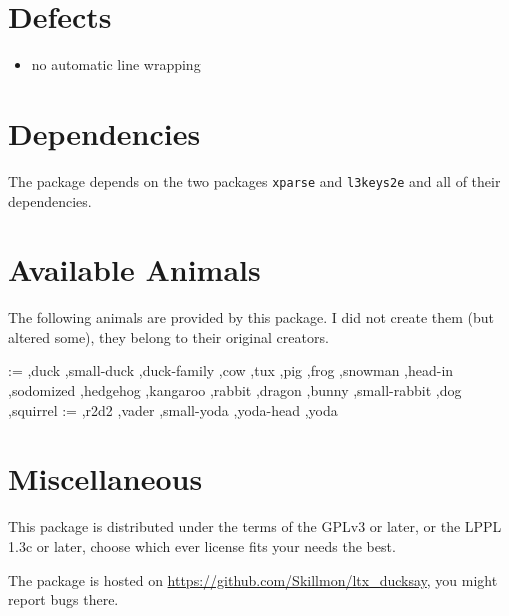 \documentclass[a4paper,10pt]{article}
\makeatletter
\newcommand*{\availableAnimal}[1]{\@for\cs:=#1\do{%
  \ifx\cs\@empty\else%
    \rlap{\expandafter\ducksay\expandafter[\cs]{\cs}}\hfill\mbox{}\\[1ex]%
  \fi%
}}
\makeatother
\begin{document}
\section{Defects}%
{\reversemarginpar{}}
\begin{itemize}
  \item no automatic line wrapping
\end{itemize}
\section{Dependencies}%
The package depends on the two packages \texttt{xparse} and \texttt{l3keys2e}
and all of their dependencies.
\section{Available Animals}\label{sec:animals}%
The following animals are provided by this package. I did not create them (but
altered some), they belong to their original creators.
\footnotesize
\begin{multicols}{2}
\availableAnimal{%
  ,duck%
  ,small-duck%
  ,duck-family%
  ,cow%
  ,tux%
  ,pig%
  ,frog%
  ,snowman%
  ,head-in%
  ,sodomized%
  ,hedgehog%
  ,kangaroo%
  ,rabbit%
  ,dragon%
  ,bunny%
  ,small-rabbit%
  ,dog%
  ,squirrel%
}\clearpage\availableAnimal{%
  ,r2d2%
  ,vader%
  ,small-yoda%
  ,yoda-head%
  ,yoda%
}%
\end{multicols}
\section{Miscellaneous}%
This package is distributed under the terms of the GPLv3 or later, or the LPPL
1.3c or later, choose which ever license fits your needs the best.

The package is hosted on \url{https://github.com/Skillmon/ltx_ducksay}, you
might report bugs there.
\clearpage
\thispagestyle{empty}
\bgroup
\Huge
\mbox{}\vfill
\centering
{}
\vfill
\hfill{}
\egroup
\end{document}
